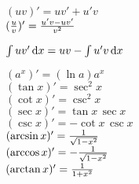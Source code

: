 \documentclass[titlepage, a4paper, landscape]{article}
\begin{document}
\begin{multicols}{2}
\begin{multicols}{4}
	$(uv)' = uv' + u'v$ \\
	$ ({u \over v})' = {u'v - uv' \over v^2 } $ \\
	\begin{scriptsize}
		$ \int uv'\,\mathrm{d} x = uv - \int u' v \,\mathrm{d} x$ \\
	\end{scriptsize}
	$ (a^x)' = (\ln a) a^x $ \\
	$ (\tan x)' = \sec^2 x $ \\
	$ (\cot x)' = \csc^2 x $ \\
	$ (\sec x)' = \tan x\, \sec x $ \\
	$ (\csc x)' = - \cot x\, \csc x $ \\
	$ (\arcsin x)' = {1 \over \sqrt{1-x^2}} $ \\
	$ (\arccos x)' = -{1 \over \sqrt{1-x^2}} $ \\
	$ (\arctan x)' = {1 \over 1+x^2} $ \\
\end{multicols}


\end{multicols}
\end{document}
